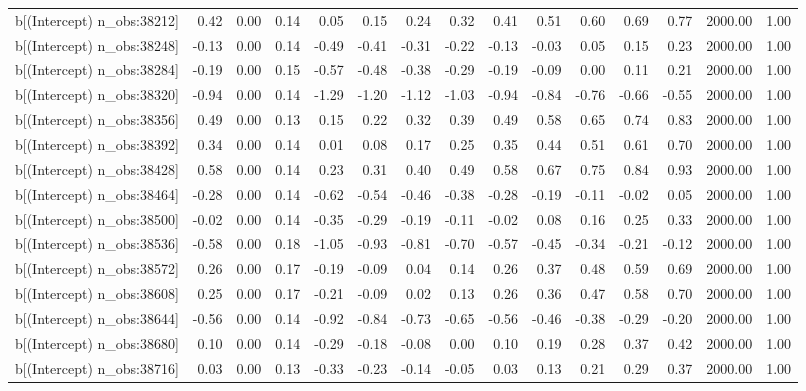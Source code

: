 \begin{table}[ht]
\begin{tabular}{rrrrrrrrrrrrrrr}
  b[(Intercept) n\_obs:38212] & 0.42 & 0.00 & 0.14 & 0.05 & 0.15 & 0.24 & 0.32 & 0.41 & 0.51 & 0.60 & 0.69 & 0.77 & 2000.00 & 1.00 \\ 
  b[(Intercept) n\_obs:38248] & -0.13 & 0.00 & 0.14 & -0.49 & -0.41 & -0.31 & -0.22 & -0.13 & -0.03 & 0.05 & 0.15 & 0.23 & 2000.00 & 1.00 \\ 
  b[(Intercept) n\_obs:38284] & -0.19 & 0.00 & 0.15 & -0.57 & -0.48 & -0.38 & -0.29 & -0.19 & -0.09 & 0.00 & 0.11 & 0.21 & 2000.00 & 1.00 \\ 
  b[(Intercept) n\_obs:38320] & -0.94 & 0.00 & 0.14 & -1.29 & -1.20 & -1.12 & -1.03 & -0.94 & -0.84 & -0.76 & -0.66 & -0.55 & 2000.00 & 1.00 \\ 
  b[(Intercept) n\_obs:38356] & 0.49 & 0.00 & 0.13 & 0.15 & 0.22 & 0.32 & 0.39 & 0.49 & 0.58 & 0.65 & 0.74 & 0.83 & 2000.00 & 1.00 \\ 
  b[(Intercept) n\_obs:38392] & 0.34 & 0.00 & 0.14 & 0.01 & 0.08 & 0.17 & 0.25 & 0.35 & 0.44 & 0.51 & 0.61 & 0.70 & 2000.00 & 1.00 \\ 
  b[(Intercept) n\_obs:38428] & 0.58 & 0.00 & 0.14 & 0.23 & 0.31 & 0.40 & 0.49 & 0.58 & 0.67 & 0.75 & 0.84 & 0.93 & 2000.00 & 1.00 \\ 
  b[(Intercept) n\_obs:38464] & -0.28 & 0.00 & 0.14 & -0.62 & -0.54 & -0.46 & -0.38 & -0.28 & -0.19 & -0.11 & -0.02 & 0.05 & 2000.00 & 1.00 \\ 
  b[(Intercept) n\_obs:38500] & -0.02 & 0.00 & 0.14 & -0.35 & -0.29 & -0.19 & -0.11 & -0.02 & 0.08 & 0.16 & 0.25 & 0.33 & 2000.00 & 1.00 \\ 
  b[(Intercept) n\_obs:38536] & -0.58 & 0.00 & 0.18 & -1.05 & -0.93 & -0.81 & -0.70 & -0.57 & -0.45 & -0.34 & -0.21 & -0.12 & 2000.00 & 1.00 \\ 
  b[(Intercept) n\_obs:38572] & 0.26 & 0.00 & 0.17 & -0.19 & -0.09 & 0.04 & 0.14 & 0.26 & 0.37 & 0.48 & 0.59 & 0.69 & 2000.00 & 1.00 \\ 
  b[(Intercept) n\_obs:38608] & 0.25 & 0.00 & 0.17 & -0.21 & -0.09 & 0.02 & 0.13 & 0.26 & 0.36 & 0.47 & 0.58 & 0.70 & 2000.00 & 1.00 \\ 
  b[(Intercept) n\_obs:38644] & -0.56 & 0.00 & 0.14 & -0.92 & -0.84 & -0.73 & -0.65 & -0.56 & -0.46 & -0.38 & -0.29 & -0.20 & 2000.00 & 1.00 \\ 
  b[(Intercept) n\_obs:38680] & 0.10 & 0.00 & 0.14 & -0.29 & -0.18 & -0.08 & 0.00 & 0.10 & 0.19 & 0.28 & 0.37 & 0.42 & 2000.00 & 1.00 \\ 
  b[(Intercept) n\_obs:38716] & 0.03 & 0.00 & 0.13 & -0.33 & -0.23 & -0.14 & -0.05 & 0.03 & 0.13 & 0.21 & 0.29 & 0.37 & 2000.00 & 1.00 \\ 

\end{tabular}
\end{table}
